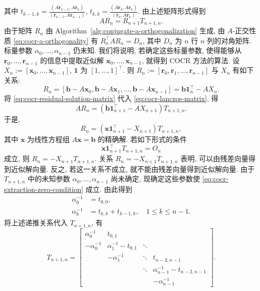 {其中 $t_{k-1,k}=\frac{(\overline{A\bm r_{k-1}},A\bm r_k)}{(\bar{\bm r}_{k-1},A\bm r_{k-1})}$, $t_{k,k}=\frac{(\overline{A\bm r_k},A\bm r_k)}{(\bar{\bm r}_k,A\bm r_k)}$. 由上述矩阵形式得到}
\begin{equation}\label{eq:cocr-lanczos-matrix}AR_n=R_{n+1}T_{n+1,n}.\end{equation}
{由于矩阵 $R_n$ 由 Algorithm\ \ref{alg:conjugate-a-orthogonalization} 生成, 由 $A$-正交性质 \eqref{eq:cocr-a-orthogonality} 有 $R_n^{\top}AR_n=D_n$, 其中 $D_n$ 为 $n$ 行 $n$ 列的对角矩阵. 标量参数 $\alpha_0,\ldots,\alpha_{n-1}$ 仍未知. 我们将说明, 若确定这些标量参数, 使得能够从 $\bm r_0,\ldots,\bm r_{n-1}$ 的信息中提取近似解 $\bm x_0,\ldots,\bm x_{n-1}$, 就得到 COCR 方法的算法.}
{设 $X_n:=[\bm x_0,\ldots,\bm x_{n-1}]$, $\bm1$ 为 $[1,\ldots,1]^{\top}$. 则 $R_n:=[\bm r_0,\bm r_1,\ldots,\bm r_{n-1}]$ 与 $X_n$ 有如下关系:}
\begin{equation}\label{eq:cocr-residual-solution-matrix}R_n=[\bm b-A\bm x_0,\bm b-A\bm x_1,\ldots,\bm b-A\bm x_{n-1}]=\bm b\bm1_n^{\top}-AX_n.\end{equation}
{将 \eqref{eq:cocr-residual-solution-matrix} 代入 \eqref{eq:cocr-lanczos-matrix}, 得}
\[AR_n=(\bm b\bm1_{n+1}^{\top}-AX_{n+1})T_{n+1,n}.\]
{于是,}
\[R_n=(\bm x\bm1_{n+1}^{\top}-X_{n+1})T_{n+1,n},\]
{其中 $\bm x$ 为线性方程组 $A\bm x=\bm b$ 的精确解. 若如下形式的条件}
\begin{equation}\label{eq:cocr-extraction-zero-condition}\bm x\bm1_{n+1}^{\top}T_{n+1,n}=O_n\end{equation}
{成立, 则 $R_n=-X_{n+1}T_{n+1,n}$. 关系 $R_n=-X_{n+1}T_{n+1,n}$ 表明, 可以由残差向量得到近似解向量. 反之, 若这一关系不成立, 就不能由残差向量得到近似解向量.}
{由于 $T_{n+1,n}$ 中的未知参数 $\alpha_0,\ldots,\alpha_{n-1}$ 尚未确定, 现确定这些参数使 \eqref{eq:cocr-extraction-zero-condition} 成立. 由此得到}
\[\begin{aligned}\alpha_0^{-1}&=t_{0,0},\\\alpha_k^{-1}&=t_{k,k}+t_{k-1,k},\quad1\le k\le n-1.\end{aligned}\]
{将上述递推关系代入 $T_{n+1,n}$, 有}
\[T_{n+1,n}=\begin{bmatrix}\alpha_0^{-1}&t_{0,1}&&\\-\alpha_0^{-1}&\alpha_1^{-1}-t_{0,1}&\ddots&\\&-\alpha_1^{-1}&\ddots&t_{n-2,n-1}\\&&\ddots&\alpha_{n-1}^{-1}-t_{n-2,n-1}\\&&&-\alpha_{n-1}^{-1}\end{bmatrix}.\]

